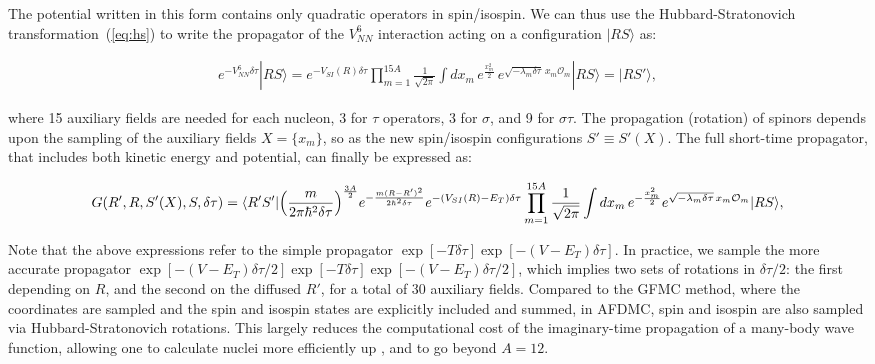 \documentclass[aps,prc,twocolumn,superscriptaddress,floatfix]{revtex4-1}
\begin{document}
The potential written in this form contains only quadratic operators in spin/isospin. 
We can thus use the Hubbard-Stratonovich transformation~(\ref{eq:hs}) to write the
propagator of the $V_{NN}^6$ interaction acting on a configuration $|RS\rangle$ as:
\begin{widetext}
\begin{align}
e^{-V_{NN}^6\delta\tau}|RS\rangle=e^{-V_{SI}(R)\delta\tau}\prod_{m=1}^{15A}\frac{1}{\sqrt{2\pi}}
\displaystyle\int dx_m\,e^{\frac{x_m^2}{2}}\,e^{\sqrt{-\lambda_m\delta\tau}\,x_m \mathcal O_m}|RS\rangle
=|RS'\rangle ,
\end{align}
\end{widetext}
where 15 auxiliary fields are needed for each nucleon, 3 for $\tau$ operators, 3 for $\sigma$,
and 9 for $\sigma\tau$. The propagation (rotation) of spinors depends upon the sampling
of the auxiliary fields $X=\{x_m\}$, so as the new spin/isospin configurations $S'\equiv S'(X)$.
The full short-time propagator, that includes both kinetic energy and potential, can finally be expressed as:
\begin{widetext}
\begin{align}
G(R',R,S'(X),S,\delta\tau)=\langle R'S'|\Big({m\over2\pi\hbar^2\delta\tau}\Big)^{3A\over2}e^{-{m(R-R')^2\over2\hbar^2\delta\tau}}
e^{-(V_{SI}(R)-E_T)\delta\tau}
\prod_{m=1}^{15A}{1\over\sqrt{2\pi}}\int dx_m\,e^{-{x_m^2\over2}}
e^{\sqrt{-\lambda_m\delta\tau}\,x_m \mathcal O_m}|RS\rangle,
\label{eq:prop}
\end{align}
\end{widetext}

Note that the above expressions refer to the simple propagator $\exp[-T\delta\tau]\exp[-(V-E_T)\delta\tau]$.
In practice, we sample the more accurate propagator 
$\exp[-(V-E_T)\delta\tau/2]\exp[-T\delta\tau]\exp[-(V-E_T)\delta\tau/2]$, which implies
two sets of rotations in $\delta\tau/2$: the first depending on $R$, and the second on 
the diffused $R'$, for a total of 30 auxiliary fields.
Compared to the GFMC method, where the coordinates are sampled and the spin and isospin states are 
explicitly included and summed, in AFDMC, spin and isospin are also sampled via 
Hubbard-Stratonovich rotations. This largely reduces the computational cost of the
imaginary-time propagation of a many-body wave function, allowing one to calculate nuclei
more efficiently up , and to go beyond $A=12$.
\end{document}
